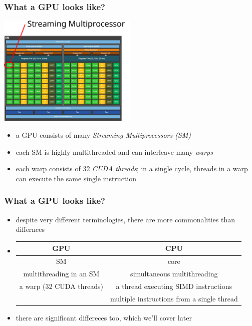 \documentclass[12pt,dvipdfmx]{beamer}
\newcommand{\ao}[1]{{\color{blue}#1}}
\begin{document}
\begin{frame}
\frametitle{What a GPU looks like?}
\begin{center}
\includegraphics[width=0.5\textwidth]{out/pdf/svg/gpu.pdf}
\end{center}

\begin{itemize}
\item a GPU consists of many \ao{\it Streaming Multiprocessors (SM)}
\item each SM is highly multithreaded and can interleave many \ao{\it warps\/}
\item each warp consists of 32 \ao{\it CUDA threads}; in a single cycle,
  threads in a warp can execute the same single instruction
\end{itemize}

\end{frame}

\begin{frame}
\frametitle{What a GPU looks like?}
\begin{itemize}
\item despite very different terminologies,
  there are more commonalities than differnces

\item []
  
  {\footnotesize
  \begin{tabular}{|c|c|}\hline
    GPU & CPU \\\hline
    SM & core \\
    multithreading in an SM & simultaneous multithreading \\
    a warp (32 CUDA threads) & a thread executing SIMD instructions \\
                & multiple instructions from a single thread \\\hline
  \end{tabular}}

\item there are significant differeces too, which we'll cover later
\end{itemize}

\end{frame}
\end{document}
